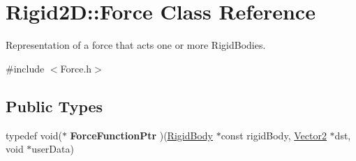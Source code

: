 \hypertarget{class_rigid2_d_1_1_force}{
\section{Rigid2D::Force Class Reference}
\label{class_rigid2_d_1_1_force}
}


Representation of a force that acts one or more RigidBodies.  




{\ttfamily \#include $<$Force.h$>$}

\subsection*{Public Types}
\begin{DoxyCompactItemize}
\item 
\hypertarget{class_rigid2_d_1_1_force_a28e8be03daef55cd2679e668befa6e25}{
typedef void($\ast$ {\bfseries ForceFunctionPtr} )(\hyperlink{class_rigid2_d_1_1_rigid_body}{RigidBody} $\ast$const rigidBody, \hyperlink{class_rigid2_d_1_1_vector2}{Vector2} $\ast$dst, void $\ast$userData)}
\label{class_rigid2_d_1_1_force_a28e8be03daef55cd2679e668befa6e25}

\end{DoxyCompactItemize}
